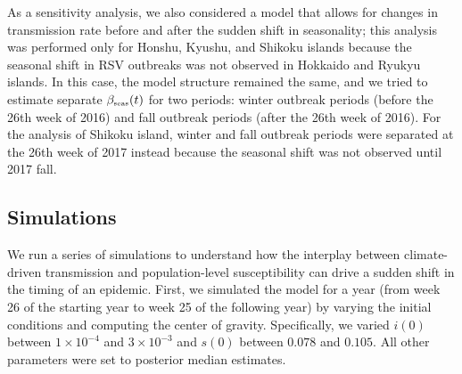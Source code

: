 \documentclass[12pt]{article}
\newcommand{\tsub}[2]{#1_{{\textrm{\tiny #2}}}}
\begin{document}
As a sensitivity analysis, we also considered a model that allows for changes in transmission rate before and after the sudden shift in seasonality;
this analysis was performed only for Honshu, Kyushu, and Shikoku islands because the seasonal shift in RSV outbreaks was not observed in Hokkaido and Ryukyu islands.
In this case, the model structure remained the same, and we tried to estimate separate $\tsub{\beta}{seas}(t)$ for two periods: winter outbreak periods (before the 26th week of 2016) and fall outbreak periods (after the 26th week of 2016).
For the analysis of Shikoku island, winter and fall outbreak periods were separated at the 26th week of 2017 instead because the seasonal shift was not observed until 2017 fall.

\subsection*{Simulations}

We run a series of simulations to understand how the interplay between climate-driven transmission and population-level susceptibility can drive a sudden shift in the timing of an epidemic.
First, we simulated the model for a year (from week 26 of the starting year to week 25 of the following year) by varying the initial conditions and computing the center of gravity.
Specifically, we varied $i(0)$ between $1\times 10^{-4}$ and $3\times 10^{-3}$ and $s(0)$ between $0.078$ and $0.105$.
All other parameters were set to posterior median estimates.
\end{document}
